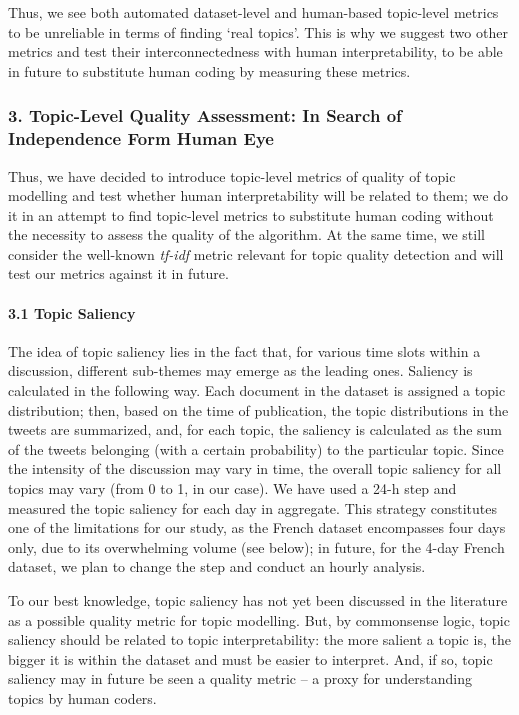 Thus, we see both automated dataset-level and human-based topic-level metrics to be unreliable in terms of finding ‘real topics’. This is why we suggest two other metrics and test their interconnectedness with human interpretability, to be able in future to substitute human coding by measuring these metrics.

\subsubsection{3. Topic-Level Quality Assessment: In Search of Independence Form Human Eye}

Thus, we have decided to introduce topic-level metrics of quality of topic modelling and test whether human interpretability will be related to them; we do it in an attempt to find topic-level metrics to substitute human coding without the necessity to assess the quality of the algorithm. At the same time, we still consider the well-known \textit{tf-idf} metric relevant for topic quality detection and will test our metrics against it in future.

\paragraph{3.1 Topic Saliency}

The idea of topic saliency lies in the fact that, for various time slots within a discussion, different sub-themes may emerge as the leading ones. Saliency is calculated in the following way. Each document in the dataset is assigned a topic distribution; then, based on the time of publication, the topic distributions in the tweets are summarized, and, for each topic, the saliency is calculated as the sum of the tweets belonging (with a certain probability) to the particular topic. Since the intensity of the discussion may vary in time, the overall topic saliency for all topics may vary (from 0 to 1, in our case). We have used a 24-h step and measured the topic saliency for each day in aggregate. This strategy constitutes one of the limitations for our study, as the French dataset encompasses four days only, due to its overwhelming volume (see below); in future, for the 4-day French dataset, we plan to change the step and conduct an hourly analysis.

To our best knowledge, topic saliency has not yet been discussed in the literature as a possible quality metric for topic modelling. But, by commonsense logic, topic saliency should be related to topic interpretability: the more salient a topic is, the bigger it is within the dataset and must be easier to interpret. And, if so, topic saliency may in future be seen a quality metric -- a proxy for understanding topics by human coders.

